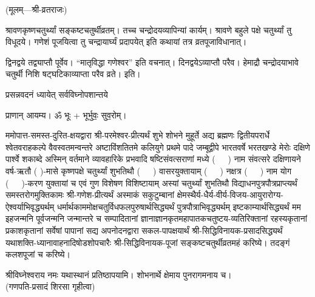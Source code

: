 
\setlength{\parindent}{0pt}
\centerline{\small{(मूलम्—श्री-व्रतराजः)}}

श्रावणकृष्णचतुर्थ्यां सङ्कष्टचतुर्थीव्रतम्। तच्च चन्द्रोदयव्यापिन्यां कार्यम्। श्रावणे बहुले पक्षे चतुर्थ्यां तु विधूदये। गणेशं पूजयित्वा तु चन्द्रायार्घ्यं प्रदापयेत् इति कथायां तत्र व्रतपूजाविधानात्।

द्विनद्वये तद्व्याप्तौ पूर्वेव। “मातृविद्धा गणेश्वर” इति वचनात्। दिनद्वयेऽव्याप्तौ परैव। हेमाद्रौ चन्द्रोदयाभावे चतुर्थी निशि षट्घटिकाव्याप्ता परैव व्रते। इति।




{प्रसन्नवदनं ध्यायेत् सर्वविघ्नोपशान्तये}

प्राणान् आयम्य। ॐ भूः + भूर्भुवः॒ सुव॒रोम्।


ममोपात्त-समस्त-दुरित-क्षयद्वारा श्री-परमेश्वर-प्रीत्यर्थं शुभे शोभने मुहूर्ते अद्य ब्रह्मणः
द्वितीयपरार्धे श्वेतवराहकल्पे वैवस्वतमन्वन्तरे अष्टाविंशतितमे कलियुगे प्रथमे पादे
जम्बूद्वीपे भारतवर्षे भरतखण्डे मेरोः दक्षिणे पार्श्वे शकाब्दे अस्मिन् वर्तमाने व्यावहारिके
प्रभवादि षष्टिसंवत्सराणां मध्ये \mbox{(~~~)} नाम संवत्सरे दक्षिणायने 
वर्ष-ऋतौ ( )-मासे कृष्णपक्षे चतुर्थ्यां शुभतिथौ \mbox{(~~~)} वासरयुक्तायाम्
\mbox{(~~~)} नक्षत्र \mbox{(~~~)} नाम योग 
\mbox{(~~~)}-करण युक्तायां च एवं गुण विशेषण विशिष्टायाम्
अस्यां चतुर्थ्यां शुभतिथौ 
विद्याधनपुत्रपौत्रप्राप्त्यर्थं समस्तरोगमुक्तिकामः श्री-गणेश-प्रीत्यर्थं
अस्माकं सकुटुम्बानां क्षेमस्थैर्य-धैर्य-वीर्य-विजय-आयुरारोग्य-ऐश्वर्याभिवृद्ध्यर्थम्
धर्मार्थकाममोक्ष\-चतुर्विधफलपुरुषार्थसिद्ध्यर्थं पुत्रपौत्राभि\-वृद्ध्यर्थम् इष्टकाम्यार्थसिद्ध्यर्थं
मम इहजन्मनि पूर्वजन्मनि जन्मान्तरे च सम्पादितानां ज्ञानाज्ञानकृतमहा\-पातकचतुष्टय-व्यतिरिक्तानां 
रहस्यकृतानां प्रकाशकृतानां सर्वेषां पापानां सद्य अपनोदनद्वारा 
सकल-पापक्षयार्थं श्री-सिद्धिविनायक-प्रसादसिद्ध्यर्थं 
यथाशक्ति-ध्यानावाहनादिषोडशोपचारैः श्री-सिद्धिविनायक-पूजां सङ्कष्टचतुर्थीव्रतमहं करिष्ये।
तदङ्गं कलशपूजां च करिष्ये। 

श्रीविघ्नेश्वराय नमः यथास्थानं प्रतिष्ठापयामि। शोभनार्थे क्षेमाय पुनरागमनाय च।\\
(गणपति-प्रसादं शिरसा गृहीत्वा)

